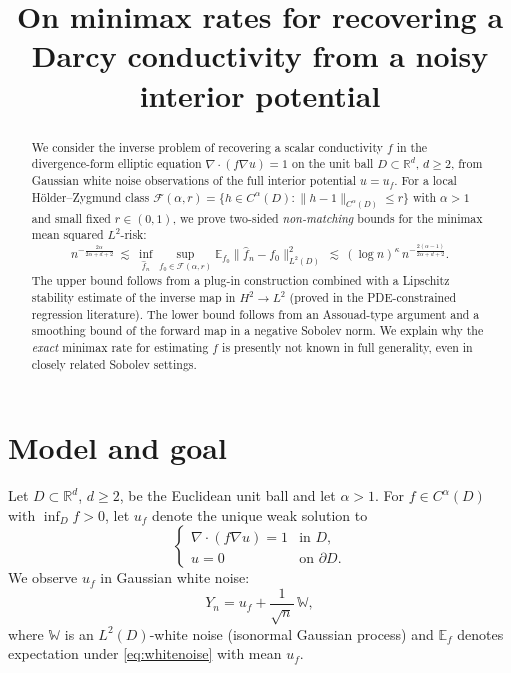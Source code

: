 \documentclass[11pt]{article}
\title{On minimax rates for recovering a Darcy conductivity from a noisy interior potential}
\author{}
\date{}
\newcommand{\R}{\mathbb{R}}
\newcommand{\D}{D}
\begin{document}
\maketitle

\begin{abstract}
We consider the inverse problem of recovering a scalar conductivity $f$ in the divergence-form elliptic equation $\nabla\cdot(f\nabla u)=1$ on the unit ball $\D\subset\R^d$, $d\ge2$, from Gaussian white noise observations of the full interior potential $u=u_f$. 
For a local H\"older--Zygmund class $\mathcal F(\alpha,r)=\{h\in C^\alpha(\D):\|h-1\|_{C^\alpha(\D)}\le r\}$ with $\alpha>1$ and small fixed $r\in(0,1)$, we prove two-sided \emph{non-matching} bounds for the minimax mean squared $L^2$-risk:
\[
n^{-\frac{2\alpha}{2\alpha+d+2}}\ \lesssim\ \inf_{\hat f_n}\sup_{f_0\in\mathcal F(\alpha,r)} \mathbb E_{f_0}\|\hat f_n-f_0\|_{L^2(\D)}^2\ \lesssim\ (\log n)^{\kappa}\,n^{-\frac{2(\alpha-1)}{2\alpha+d+2}}.
\]
The upper bound follows from a plug-in construction combined with a Lipschitz stability estimate of the inverse map in $H^2\to L^2$ (proved in the PDE-constrained regression literature). The lower bound follows from an Assouad-type argument and a smoothing bound of the forward map in a negative Sobolev norm. We explain why the \emph{exact} minimax rate for estimating $f$ is presently not known in full generality, even in closely related Sobolev settings.
\end{abstract}

\section{Model and goal}

Let $\D\subset\R^d$, $d\ge2$, be the Euclidean unit ball and let $\alpha>1$. For $f\in C^\alpha(\D)$ with $\inf_\D f>0$, let $u_f$ denote the unique weak solution to
\begin{equation}\label{eq:darcy}
\begin{cases}
\nabla\cdot(f\nabla u)=1 & \text{in }\D,\\
u=0 & \text{on }\partial\D.
\end{cases}
\end{equation}
We observe $u_f$ in Gaussian white noise:
\begin{equation}\label{eq:whitenoise}
Y_n = u_f + \frac{1}{\sqrt n}\, \mathbb W,
\end{equation}
where $\mathbb W$ is an $L^2(\D)$-white noise (isonormal Gaussian process) and $\mathbb E_f$ denotes expectation under \eqref{eq:whitenoise} with mean $u_f$.
\end{document}
